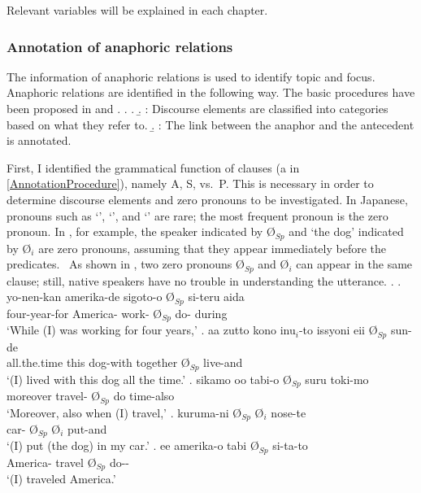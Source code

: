 Relevant variables will be explained in each chapter.

\subsubsection{Annotation of anaphoric relations}\label{FW:Cor:AnaRel}

The information of anaphoric relations is used
to identify topic and focus.
Anaphoric relations are identified in the following way.
The basic procedures have been proposed in  and .
\ex.\label{AnnotationProcedure} 
	\a. 
	\b. : Discourse elements are classified into categories based on what they refer to.
	\b. :
		The link between the anaphor and the antecedent is annotated.


First,
I identified the grammatical function of clauses (a in \ref{AnnotationProcedure}),
namely A, S, vs.~P.
This is necessary in order to determine discourse elements and zero pronouns to be investigated.
In Japanese,
pronouns such as  `',  `', and  `' are rare;
the most frequent pronoun is the zero pronoun.
In \Next,
for example, the speaker indicated by {\O$_{Sp}$} and `the dog' indicated by {\O$_{i}$} are zero pronouns,
assuming that they appear immediately before the predicates.%
	\
As shown in \Next[d],
two zero pronouns {\O$_{Sp}$} and {\O$_{i}$} can appear in the same clause;
still, native speakers have no trouble in understanding the utterance.
\ex. \ag. yo-nen-kan amerika-de sigoto-o {\O$_{Sp}$} si-teru aida \\
			four-year-for America- work- {\O$_{Sp}$} do- during \\
			`While (I) was working for four years,'
	\bg. aa zutto kono inu$_{i}$-to issyoni eii {\O$_{Sp}$} sun-de \\
		 all.the.time this dog-with together \ab{fl} {\O$_{Sp}$} live-and \\
		`(I) lived with this dog all the time.'
	\bg. sikamo oo tabi-o {\O$_{Sp}$} suru toki-mo \\
		moreover  travel- {\O$_{Sp}$} do time-also \\
		`Moreover, also when (I) travel,'
	\bg. kuruma-ni {\O$_{Sp}$} {\O$_{i}$} nose-te \\
		car- {\O$_{Sp}$} {\O$_{i}$} put-and \\
		`(I) put (the dog) in my car.'
	\bg. ee amerika-o tabi {\O$_{Sp}$} si-ta-to \\
		 America- travel {\O$_{Sp}$} do-- \\
		`(I) traveled America.'
		\hfill{}

